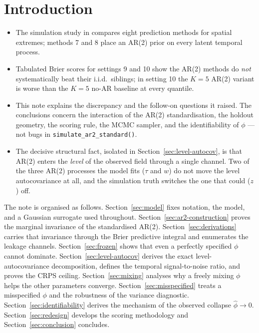 \documentclass[11pt]{article}
\theoremstyle{definition}
\begin{document}
\section{Introduction}
\label{sec:intro}

\begin{itemize}[leftmargin=1.4em, itemsep=2pt]
  \item The simulation study in  compares
        eight prediction methods for spatial extremes; methods 7 and 8
        place an AR(2) prior on every latent temporal process.
  \item Tabulated Brier scores for settings 9 and 10 show the AR(2)
        methods do \emph{not} systematically beat their i.i.d.\ siblings;
        in setting 10 the $K=5$ AR(2) variant is worse than the $K=5$
        no-AR baseline at every quantile.
  \item This note explains the discrepancy and the follow-on questions
        it raised. The conclusions concern the interaction of the AR(2)
        standardisation, the holdout geometry, the scoring rule, the
        MCMC sampler, and the identifiability of $\phi$ --- not bugs in
        \verb|simulate_ar2_standard()|.
  \item The decisive structural fact, isolated in
        Section~\ref{sec:level-autocov}, is that AR(2) enters the
        \emph{level} of the observed field through a single channel.
        Two of the three AR(2) processes the model fits ($\tau$ and
        $w$) do not move the level autocovariance at all, and the
        simulation truth switches the one that could ($z$) off.
\end{itemize}

The note is organised as follows.
Section~\ref{sec:model} fixes notation, the model, and a Gaussian
surrogate used throughout.
Section~\ref{sec:ar2-construction} proves the marginal invariance of
the standardised AR(2).
Section~\ref{sec:derivations} carries that invariance through the
Brier predictive integral and enumerates the leakage channels.
Section~\ref{sec:frozen} shows that even a perfectly specified $\phi$
cannot dominate.
Section~\ref{sec:level-autocov} derives the exact level-autocovariance
decomposition, defines the temporal signal-to-noise ratio, and proves
the CRPS ceiling.
Section~\ref{sec:mixing} analyses why a freely mixing $\phi$ helps the
other parameters converge.
Section~\ref{sec:misspecified} treats a misspecified $\phi$ and the
robustness of the variance diagnostic.
Section~\ref{sec:identifiability} derives the mechanism of the
observed collapse $\hat\phi \to 0$.
Section~\ref{sec:redesign} develops the scoring methodology and
Section~\ref{sec:conclusion} concludes.
\end{document}

